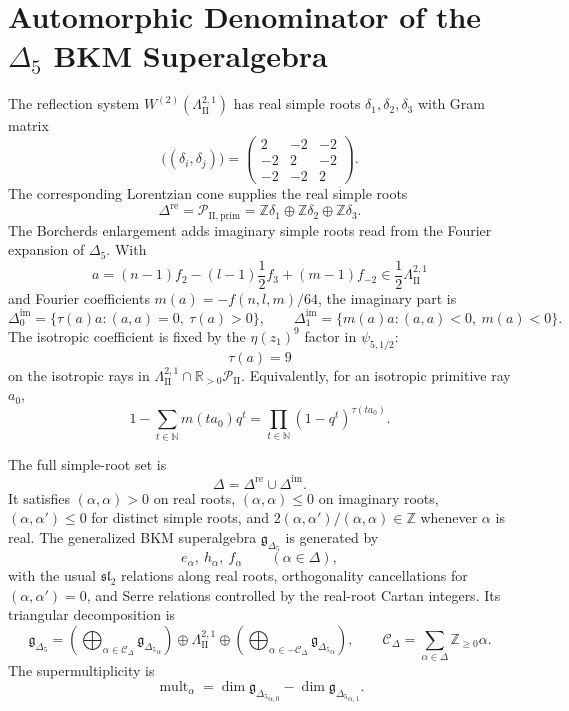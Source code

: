 \providecommand{\ZZ}{\mathbb{Z}}
\providecommand{\NN}{\mathbb{N}}
\providecommand{\RR}{\mathbb{R}}
\providecommand{\CC}{\mathbb{C}}
\providecommand{\Delaf}{\Delta_5}
\providecommand{\LamII}{\Lambda^{2,1}_{\mathrm{II}}}
\providecommand{\gbkm}{\mathfrak{g}_{\Delta_5}}
\providecommand{\mult}{\operatorname{mult}}

\section*{Automorphic Denominator of the $\Delta_5$ BKM Superalgebra}

The reflection system $W^{(2)}(\LamII)$ has real simple roots
$\delta_1,\delta_2,\delta_3$ with Gram matrix
\[
  \bigl((\delta_i,\delta_j)\bigr)=
  \begin{pmatrix}
  2 & -2 & -2\\
  -2 & 2 & -2\\
  -2 & -2 & 2
  \end{pmatrix}.
\]
The corresponding Lorentzian cone supplies the real simple roots
\[
  \Delta^{\mathrm{re}}
  =\mathcal P_{\mathrm{II},\mathrm{prim}}
  =\ZZ\delta_1\oplus\ZZ\delta_2\oplus\ZZ\delta_3.
\]
The Borcherds enlargement adds imaginary simple roots read from the
Fourier expansion of $\Delaf$.  With
\[
  a=(n-1)f_2-(l-1)\frac12f_3+(m-1)f_{-2}
  \in \frac12\LamII
\]
and Fourier coefficients $m(a)=-f(n,l,m)/64$, the imaginary part is
\[
  \Delta^{\mathrm{im}}_0
  =\{\tau(a)a:(a,a)=0,\ \tau(a)>0\},
  \qquad
  \Delta^{\mathrm{im}}_1
  =\{m(a)a:(a,a)<0,\ m(a)<0\}.
\]
The isotropic coefficient is fixed by the $\eta(z_1)^9$ factor in
$\psi_{5,1/2}$:
\[
  \tau(a)=9
\]
on the isotropic rays in
$\LamII\cap\RR_{>0}\mathcal P_{\mathrm{II}}$.  Equivalently, for an
isotropic primitive ray $a_0$,
\[
  1-\sum_{t\in\NN}m(ta_0)q^t
  =\prod_{t\in\NN}(1-q^t)^{\tau(ta_0)}.
\]

The full simple-root set is
\[
  \Delta=\Delta^{\mathrm{re}}\cup\Delta^{\mathrm{im}}.
\]
It satisfies $(\alpha,\alpha)>0$ on real roots,
$(\alpha,\alpha)\leq0$ on imaginary roots,
$(\alpha,\alpha')\leq0$ for distinct simple roots, and
$2(\alpha,\alpha')/(\alpha,\alpha)\in\ZZ$ whenever $\alpha$ is real.
The generalized BKM superalgebra $\gbkm$ is generated by
\[
  e_\alpha,\ h_\alpha,\ f_\alpha\qquad (\alpha\in\Delta),
\]
with the usual $\mathfrak{sl}_2$ relations along real roots,
orthogonality cancellations for $(\alpha,\alpha')=0$, and Serre
relations controlled by the real-root Cartan integers.  Its triangular
decomposition is
\[
  \gbkm=
  \left(\bigoplus_{\alpha\in\mathcal C_\Delta}\gbkm_\alpha\right)
  \oplus\LamII\oplus
  \left(\bigoplus_{\alpha\in-\mathcal C_\Delta}\gbkm_\alpha\right),
  \qquad
  \mathcal C_\Delta=\sum_{\alpha\in\Delta}\ZZ_{\geq0}\alpha.
\]
The supermultiplicity is
\[
  \mult_\alpha=\dim\gbkm_{\alpha,0}-\dim\gbkm_{\alpha,1}.
\]

